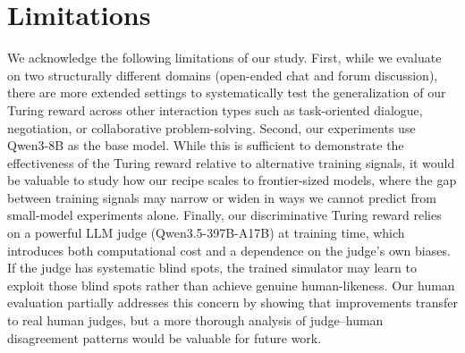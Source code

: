 \documentclass[11pt]{article}
\begin{document}




\section*{Limitations}

We acknowledge the following limitations of our study. First, while we evaluate on two structurally different domains (open-ended chat and forum discussion), there are more extended settings to systematically test the generalization of our Turing reward across other interaction types such as task-oriented dialogue, negotiation, or collaborative problem-solving. Second, our experiments use Qwen3-8B as the base model. While this is sufficient to demonstrate the effectiveness of the Turing reward relative to alternative training signals, it would be valuable to study how our recipe scales to frontier-sized models, where the gap between training signals may narrow or widen in ways we cannot predict from small-model experiments alone. Finally, our discriminative Turing reward relies on a powerful LLM judge (Qwen3.5-397B-A17B) at training time, which introduces both computational cost and a dependence on the judge's own biases. If the judge has systematic blind spots, the trained simulator may learn to exploit those blind spots rather than achieve genuine human-likeness. Our human evaluation partially addresses this concern by showing that improvements transfer to real human judges, but a more thorough analysis of judge–human disagreement patterns would be valuable for future work.
\end{document}
